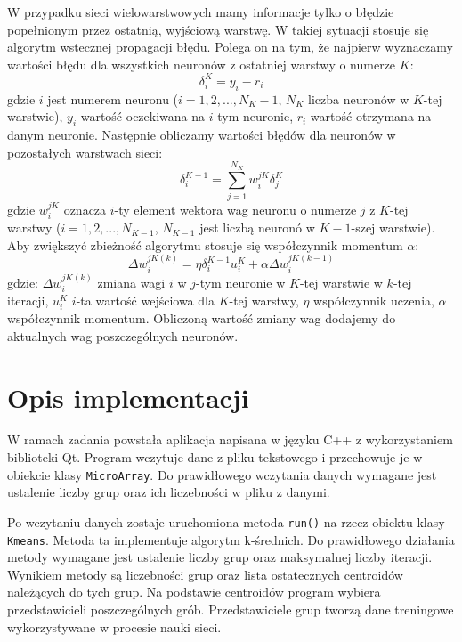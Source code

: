 \documentclass{classrep}
\begin{document}
W przypadku sieci wielowarstwowych mamy informacje tylko o błędzie popełnionym przez ostatnią, wyjściową warstwę.	
W takiej sytuacji stosuje się algorytm wstecznej propagacji błędu. Polega on na	
tym, że najpierw wyznaczamy wartości błędu dla wszystkich neuronów z	
ostatniej warstwy o numerze $K$:	
\begin{equation}	
  \delta_i^K = y_i - r_i	
\end{equation}	
gdzie $i$ jest numerem neuronu ($i = 1, 2, ...,N_K - 1$, $N_K$ \ppauza liczba	
neuronów w $K$-tej warstwie), $y_i$ \ppauza wartość oczekiwana na $i$-tym	
neuronie, $r_i$ \ppauza wartość otrzymana na danym neuronie.		
Następnie obliczamy wartości błędów dla neuronów w pozostałych warstwach sieci:	
\begin{equation}	
  \delta_i^{K-1} = \displaystyle \sum_{j=1}^{N_{K}} w_i^{jK} \delta_j^K	
\end{equation}	
gdzie $w_i^{jK}$ oznacza $i$-ty element wektora wag neuronu o numerze $j$ z	
$K$-tej warstwy ($i=1,2,...,N_{K-1}$, $N_{K-1}$ jest liczbą neuronó w	
$K-1$-szej warstwie).		
Aby zwiększyć zbieżność algorytmu stosuje się współczynnik momentum $\alpha$:
\begin{equation}	
\Delta w_i^{jK(k)} = \eta \delta_i^{K-1} u_i^K + \alpha \Delta w_i^{jK(k-1)}	
\end{equation}	
gdzie: $\Delta w_i^{jK(k)}$ \ppauza zmiana wagi $i$ w $j$-tym neuronie w	
$K$-tej warstwie w $k$-tej iteracji, $u_i^K$ \ppauza $i$-ta wartość wejściowa
dla $K$-tej warstwy, $\eta$ \ppauza współczynnik uczenia, $\alpha$ \ppauza	
współczynnik momentum. Obliczoną wartość zmiany wag dodajemy do aktualnych	
wag poszczególnych neuronów.

\section{Opis implementacji}
W ramach zadania powstała aplikacja napisana w języku C++ z wykorzystaniem biblioteki Qt. Program wczytuje dane z pliku tekstowego i przechowuje je w obiekcie klasy \verb+MicroArray+. Do prawidłowego wczytania danych wymagane jest ustalenie liczby grup oraz ich liczebności w pliku z danymi.

Po wczytaniu danych zostaje uruchomiona metoda \verb+run()+ na rzecz obiektu klasy \verb+Kmeans+. Metoda ta implementuje algorytm k-średnich. Do prawidłowego działania metody wymagane jest ustalenie liczby grup oraz maksymalnej liczby iteracji. Wynikiem metody są liczebności grup oraz lista ostatecznych centroidów należących do tych grup. Na podstawie centroidów program wybiera przedstawicieli poszczególnych grób. Przedstawiciele grup tworzą dane treningowe wykorzystywane w procesie nauki sieci.
\end{document}
